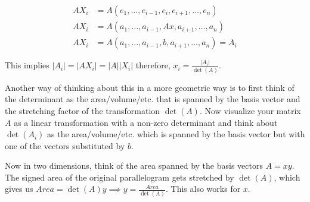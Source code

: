 \begin{align*}
    A X_i & = A (e_1, \dots, e_{i - 1}, e_i, e_{i + 1}, \dots, e_n)     \\
    A X_i & = A (a_1, \dots, a_{i - 1}, Ax, a_{i + 1}, \dots, a_n)      \\
    A X_i & = A (a_1, \dots, a_{i - 1}, b, a_{i + 1}, \dots, a_n) = A_i
\end{align*}

This implies \(|A_i| = |AX_i| = |A||X_i|\) therefore, \(x_i = \frac{|A_i|}{\det(A)}\).

\QED

Another way of thinking about this in a more geometric way is to first think of the determinant as the area/volume/etc. that is spanned by the basis 
vector and the stretching factor of the transformation \(\det(A)\). Now visualize your matrix \(A\) as a linear transformation with
a non-zero determinant and think about \(\det(A_i)\) as the area/volume/etc. which is spanned by the basis vector but with one of the vectors substituted 
by \(b\).

Now in two dimensions, think of the area spanned by the basis vectors \(A = xy\). The signed area of the original parallelogram gets
stretched by \(\det(A)\), which gives us \(Area = \det(A)y \implies y = \frac{Area}{\det(A)}\). This also works for \(x\).

